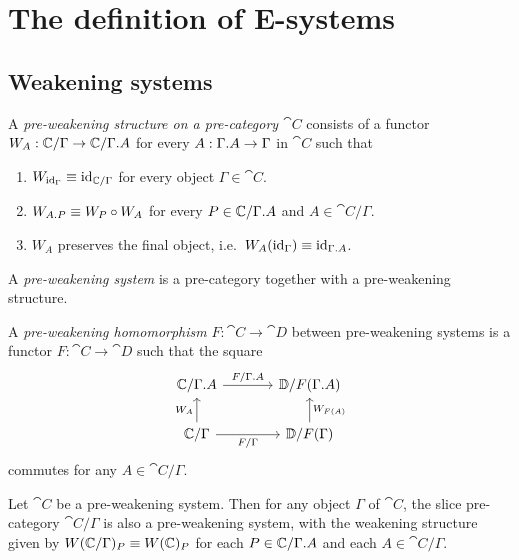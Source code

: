 \section{The definition of E-systems}\label{sec:esys_defn}
\subsection{Weakening systems}

\begin{defn}
A \emph{pre-weakening structure on a pre-category $\cat{C}$} consists of a functor
$W_A:\cat{C}/\Gamma\to \cat{C}/\ctxext{\Gamma}{A}$ for every $A:\ctxext{\Gamma}{A}\to \Gamma$ in $\cat{C}$ such 
that
\begin{enumerate}
\item $W_{{\mathrm{id}_{\Gamma}}}\equiv {\mathrm{id}_{\mathbb{C}/\Gamma}}$ for every object $\Gamma\in\cat{C}$.
\item $W_{\ctxext{A}{P}}\jdeq W_P\circ W_A$ for every $P\in\cat{C}/\ctxext{\Gamma}{A}$ and $A\in\cat{C}/\Gamma$.
\item $W_A$ preserves the final object, i.e.~$W_A(\catid{\Gamma})\jdeq \catid{\ctxext{\Gamma}{A}}$.
\end{enumerate}
A \emph{pre-weakening system} is a pre-category together with a pre-weakening structure.
\end{defn}

\begin{defn}
A \emph{pre-weakening homomorphism} $F:\cat{C}\to\cat{D}$ between pre-weakening systems
is a functor $F:\cat{C}\to\cat{D}$ such that the square
\begin{equation*}
\begin{tikzcd}[column sep=large]
\cat{C}/\ctxext{\Gamma}{A}
  \arrow[r,"F/\ctxext{\Gamma}{A}"]
  &
\cat{D}/F(\ctxext{\Gamma}{A})
  \\
\cat{C}/\Gamma
  \arrow[u,"W_A"]
  \arrow[r,swap,"F/\Gamma"]
  &
\cat{D}/F(\Gamma)
  \arrow[u,swap,"W_{F(A)}"]
\end{tikzcd}
\end{equation*}
commutes for any $A\in\cat{C}/\Gamma$.
\end{defn}

\begin{lem}
Let $\cat{C}$ be a pre-weakening system. Then for any object $\Gamma$ of $\cat{C}$,
the slice pre-category $\cat{C}/\Gamma$ is also a pre-weakening system, with the weakening
structure given by $W(\mathbb{C}/\Gamma)_P\equiv W(\mathbb{C})_P$ for each $P\in\cat{C}/\ctxext{\Gamma}{A}$
and each $A\in\cat{C}/\Gamma$.
\end{lem}

